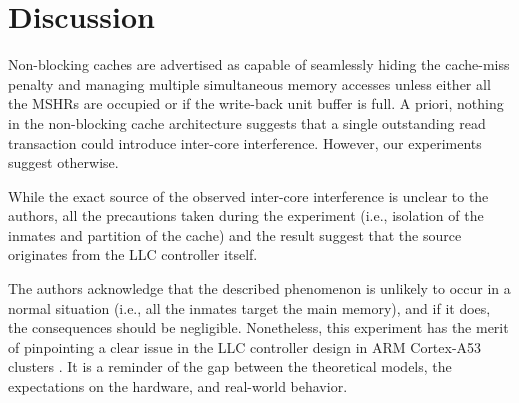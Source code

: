 \section{Discussion}
%
%

    Non-blocking caches are advertised as capable of seamlessly hiding the cache-miss penalty and managing multiple simultaneous memory accesses unless either all the MSHRs are occupied or if the write-back unit buffer is full.
    A priori, nothing in the non-blocking cache architecture suggests that a single outstanding read transaction could introduce inter-core interference.
    However, our experiments suggest otherwise.


    While the exact source of the observed inter-core interference is unclear to the authors, all the precautions taken during the experiment (i.e., isolation of the inmates and partition of the cache) and the result suggest that the source originates from the LLC controller itself.

    The authors acknowledge that the described phenomenon is unlikely to occur in a normal situation (i.e., all the inmates target the main memory), and if it does, the consequences should be negligible.
    Nonetheless, this experiment has the merit of pinpointing a clear issue in the LLC controller design in ARM Cortex-A53 clusters \cite{ARM-cortex-A53}.
    It is a reminder of the gap between the theoretical models, the expectations on the hardware, and real-world behavior.


